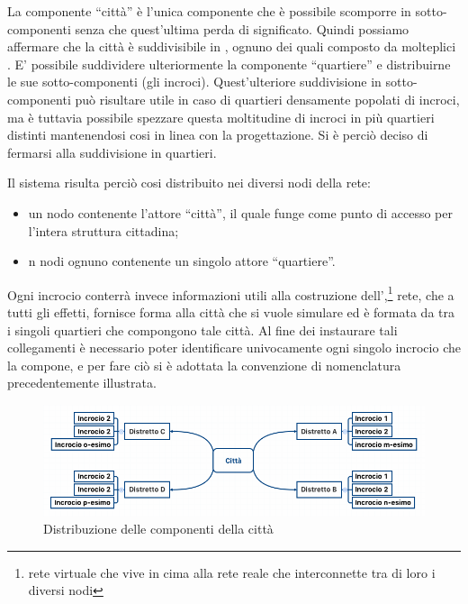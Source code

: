 La componente ``città'' è l'unica componente che è possibile scomporre in sotto-componenti senza che quest'ultima perda di significato. Quindi possiamo affermare che la città è suddivisibile in , ognuno dei quali composto da molteplici . E' possibile suddividere ulteriormente la componente ``quartiere'' e distribuirne le sue sotto-componenti (gli incroci). Quest'ulteriore suddivisione in sotto-componenti può risultare utile in caso di quartieri densamente popolati di incroci, ma è tuttavia possibile spezzare questa moltitudine di incroci in più quartieri distinti mantenendosi cosi in linea con la progettazione. Si è perciò deciso di fermarsi alla suddivisione in quartieri.

Il sistema risulta perciò cosi distribuito nei diversi nodi della rete:

\begin{itemize}
\item{un nodo contenente l'attore ``città'', il quale funge come punto di accesso per l'intera struttura cittadina;}
\item{n nodi ognuno contenente un singolo attore ``quartiere''.}
\end{itemize}

Ogni incrocio conterrà invece informazioni utili alla costruzione dell',\footnote{rete virtuale che vive in cima alla rete reale che interconnette tra di loro i diversi nodi} rete, che a tutti gli effetti, fornisce forma alla città che si vuole simulare ed è formata da  tra i singoli quartieri che compongono tale città. Al fine dei instaurare tali collegamenti è necessario poter identificare univocamente ogni singolo incrocio che la compone, e per fare ciò si è adottata la convenzione di nomenclatura precedentemente illustrata.

\begin{figure}[h!]
\centering
\includegraphics[scale=0.5]{images/analysis/city-distribution.png}
\caption{Distribuzione delle componenti della città}
\label{analisi-della-soluzione-distribuzione-distribuzione-citta}
\end{figure}

